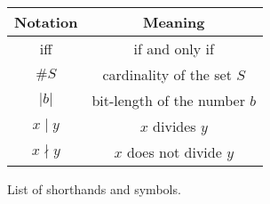 \begin{figure}
\begin{center}
\begin{tabular}{ c | c }
\hline
Notation & Meaning\\
\hline
iff & if and only if\\
$\#S$ & cardinality of the set $S$\\
$\vert b \vert$ & bit-length of the number $b$\\
$x \mid y$ & $x$ divides $y$\\
$x \nmid y$ & $x$ does not divide $y$\\
\hline
\end{tabular}
\end{center}
\caption{List of shorthands and symbols.}
\label{fig:symbols}
\end{figure}
